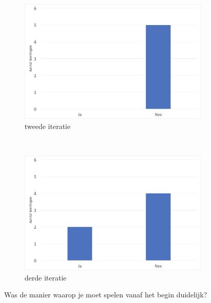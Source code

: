 \documentclass[11pt]{article}
\begin{document}
\begin{figure}
	\centering
    \begin{subfigure}[b]{0.48\textwidth}
        \includegraphics[width=\textwidth]{pictures/2_DuidelijkBegin.png}
        \caption{tweede iteratie}
        \label{duidelijk:begin:twee}
    \end{subfigure}
    ~
    \begin{subfigure}[b]{0.48\textwidth}
        \includegraphics[width=\textwidth]{pictures/3_DuidelijkBegin.png}
        \caption{derde iteratie}
        \label{duidelijk:begin:drie}
    \end{subfigure}
    \caption{Was de manier waarop je moet spelen vanaf het begin duidelijk?}\label{duidelijk:begin}
\end{figure}
\end{document}
